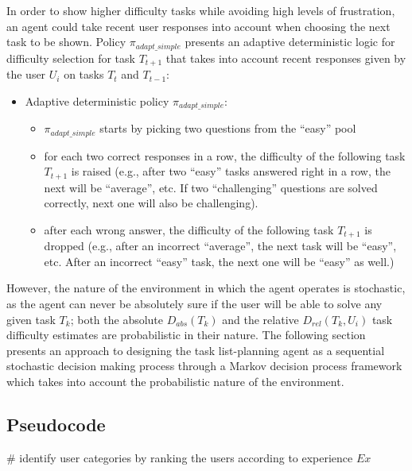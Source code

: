 In order to show higher difficulty tasks while avoiding high levels of frustration, an agent could take recent user responses into account when choosing the next task to be shown.
Policy $\pi_{adapt\_simple}$ presents an adaptive deterministic logic for difficulty selection for task $T_{t+1}$ that takes into account recent responses given by the user $U_i$ on tasks $T_t$ and $T_{t-1}$:

\begin{itemize}
    \item Adaptive deterministic policy $\pi_{adapt\_simple}$:
    \begin{itemize}
        \item $\pi_{adapt\_simple}$ starts by picking two questions from the ``easy'' pool
        \item for each two correct responses in a row, the difficulty of the following task $T_{t+1}$ is raised (e.g., after two ``easy'' tasks answered right in a row, the next will be ``average'', etc.
        If two ``challenging'' questions are solved correctly, next one will also be challenging).
        \item after each wrong answer, the difficulty of the following task $T_{t+1}$ is dropped (e.g., after an incorrect ``average'', the next task will be ``easy'', etc.
        After an incorrect ``easy'' task, the next one will be ``easy'' as well.)
    \end{itemize}
\end{itemize}

However, the nature of the environment in which the agent operates is stochastic, as the agent can never be absolutely sure if the user will be able to solve any given task $T_k$;
both the absolute $D_{abs}(T_k)$ and the relative $D_{rel}(T_k, U_i)$ task difficulty estimates are probabilistic in their nature.
The following section presents an approach to designing the task list-planning agent as a sequential stochastic decision making process through a Markov decision process framework which takes into account the probabilistic nature of the environment.

\subsection{Pseudocode} \label{subsec:q3_pseudocode}

\# identify user categories by ranking the users according to experience $Ex$

\vspace{5mm}

